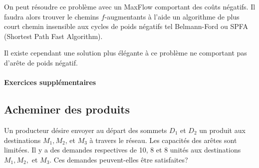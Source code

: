 \begin{solution}
  On peut résoudre ce problème avec un MaxFlow comportant des coûts négatifs.
  Il faudra alors trouver le chemins $f$-augmentants à l'aide un algorithme de plus court chemin insensible
  aux cycles de poids négatifs tel Belmann-Ford ou SPFA (Shortest Path Fast Algorithm).

  Il existe cependant une solution plus élégante à ce problème ne comportant pas d'arête
  de poids négatif.
\end{solution}

\paragraph{Exercices supplémentaires}

\subsection{Acheminer des produits}
Un producteur désire envoyer au départ des sommets $D_1$ et $D_2$ un produit aux destinations $M_1, M_2$, et $M_3$ à travers le réseau. Les capacités des arêtes sont limitées. Il y a des demandes respectives de 10, 8 et 8 unités aux destinations $M_1, M_2,$ et $M_3$. Ces demandes peuvent-elles être satisfaites?

\begin{figure}[h!]
  \centering
\end{figure}

